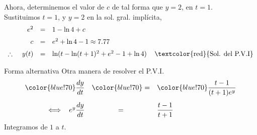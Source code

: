 \documentclass{beamer}
\begin{document}
\begin{frame}[t]
	\begin{exampleblock}{}
		Ahora, determinemos el valor de \(c\) de tal forma que \(y=2\), en \(t=1\). \\[2mm]
		Sustituimos \(t=1\), y \(y=2\) en la sol. gral. implícita,
		\[
			\begin{array}{rcl}
				e^2 & = & 1- \ln 4+c \\[2mm]
				c & = & e^2+ \ln 4-1 \approx 7.77\\[2mm]
				\therefore \hspace{4mm} y(t) & = & \ln (t- \ln (t+1) ^2+e^2-1+ \ln 4) \hspace{4mm} \mbox{\textcolor{red}{Sol. del P.V.I}}
			\end{array}
		\]
	\end{exampleblock}
	\vspace{-2mm}
	\begin{exampleblock}{Forma alternativa}
		Otra manera de resolver el P.V.I.
		\[
			\begin{array}{rcl}
				\color{blue!70} \dfrac{dy}{dt} & \color{blue!70} = & \color{blue!70} \dfrac{t-1}{(t+1) e^y} \\[5mm]
				\iff \hspace{2mm} e^y \dfrac{dy}{dt} & = & \dfrac{t-1}{t+1}
			\end{array}
		\]
		Integramos de \(1\) a \(t\).
	\end{exampleblock}
\end{frame}
\end{document}
